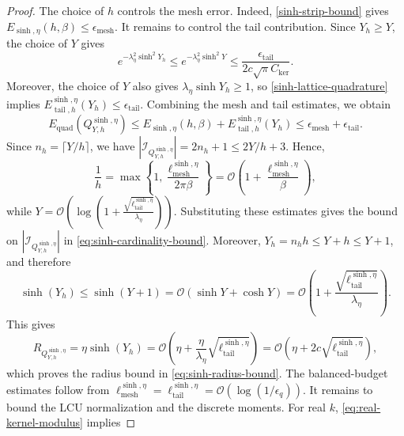 \documentclass[10pt,reqno]{article}
\numberwithin{equation}{section}
\theoremstyle{plain}
\theoremstyle{definition}
\begin{document}
\begin{proof}
The choice of \(h\) controls the mesh error. Indeed, \cref{sinh-strip-bound} gives \(E_{\operatorname{sinh},\eta}(h,\beta)\le \epsilon_{\operatorname{mesh}}\). It remains to control the tail contribution. Since \(Y_h\ge Y\), the choice of \(Y\) gives
\begin{equation}
e^{-\lambda_\eta^2\sinh^2Y_h}\le e^{-\lambda_\eta^2\sinh^2Y}\le \frac{\epsilon_{\operatorname{tail}}}{2c\sqrt{\pi}C_{\operatorname{ker}}}.
\end{equation}
Moreover, the choice of \(Y\) also gives \(\lambda_\eta\sinh Y_h\ge1\), so \cref{sinh-lattice-quadrature} implies \(E_{\operatorname{tail},h}^{\operatorname{sinh},\eta}(Y_h)\le \epsilon_{\operatorname{tail}}\). Combining the mesh and tail estimates, we obtain
\begin{equation}
E_{\operatorname{quad}}(Q_{Y,h}^{\operatorname{sinh},\eta})\le E_{\operatorname{sinh},\eta}(h,\beta)+E_{\operatorname{tail},h}^{\operatorname{sinh},\eta}(Y_h)\le \epsilon_{\operatorname{mesh}}+\epsilon_{\operatorname{tail}}.
\end{equation}
Since \(n_h=\lceil Y/h\rceil\), we have \(|\mathcal I_{Q_{Y,h}^{\operatorname{sinh},\eta}}|=2n_h+1\le 2Y/h+3\). Hence,
\begin{equation}
\frac1h=\max\left\{1,\frac{\ell_{\operatorname{mesh}}^{\operatorname{sinh},\eta}}{2\pi\beta}\right\}=\mathcal O\left(1+\frac{\ell_{\operatorname{mesh}}^{\operatorname{sinh},\eta}}{\beta}\right),
\end{equation}
while \(Y=\mathcal O\left(\log\left(1+\frac{\sqrt{\ell_{\operatorname{tail}}^{\operatorname{sinh},\eta}}}{\lambda_\eta}\right)\right)\). Substituting these estimates gives the bound on \(|\mathcal I_{Q_{Y,h}^{\operatorname{sinh},\eta}}|\) in \cref{eq:sinh-cardinality-bound}. Moreover, \(Y_h=n_hh\le Y+h\le Y+1\), and therefore
\begin{equation}
\sinh(Y_h)\le \sinh(Y+1)=\mathcal O(\sinh Y+\cosh Y)=\mathcal O\left(1+\frac{\sqrt{\ell_{\operatorname{tail}}^{\operatorname{sinh},\eta}}}{\lambda_\eta}\right).
\end{equation}
This gives
\begin{equation}
R_{Q_{Y,h}^{\operatorname{sinh},\eta}}=\eta\sinh(Y_h)=\mathcal O\left(\eta+\frac{\eta}{\lambda_\eta}\sqrt{\ell_{\operatorname{tail}}^{\operatorname{sinh},\eta}}\right)=\mathcal O\left(\eta+2c\sqrt{\ell_{\operatorname{tail}}^{\operatorname{sinh},\eta}}\right),
\end{equation}
which proves the radius bound in \cref{eq:sinh-radius-bound}. The balanced-budget estimates follow from \(\ell_{\operatorname{mesh}}^{\operatorname{sinh},\eta}=\ell_{\operatorname{tail}}^{\operatorname{sinh},\eta}=\mathcal O(\log(1/\epsilon_q))\). It remains to bound the LCU normalization and the discrete moments. For real \(k\), \cref{eq:real-kernel-modulus} implies

\end{proof}
\end{document}
